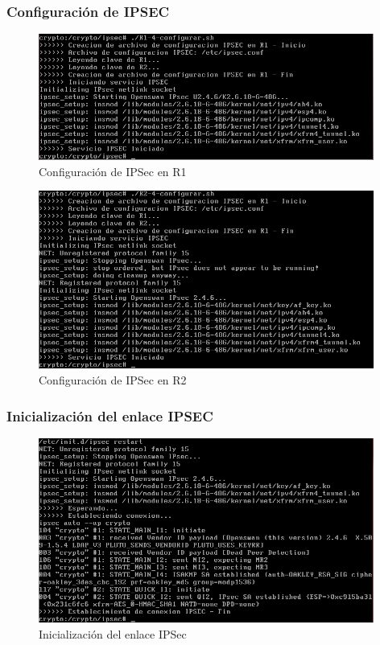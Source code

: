 \documentclass[a4paper,10pt]{article}
\begin{document}
			\subsubsection{Configuración de IPSEC}	
	\begin{figure}[H]
		\centering
		\includegraphics[width=11cm]{Imagenes/configurarIPsecR1.png}
		\caption{Configuración de IPSec en R1}
	\end{figure}	
	\begin{figure}[H]
		\centering
		\includegraphics[width=11cm]{Imagenes/configurarIPsecR2.png}
		\caption{Configuración de IPSec en R2}
	\end{figure}	
	
			\subsubsection{Inicialización del enlace IPSEC}	
	\begin{figure}[H]
		\centering
		\includegraphics[width=11cm]{Imagenes/inicializarEnlaceIPsec.png}
		\caption{Inicializaci\'on del enlace IPSec}
	\end{figure}	
	
\end{document}
